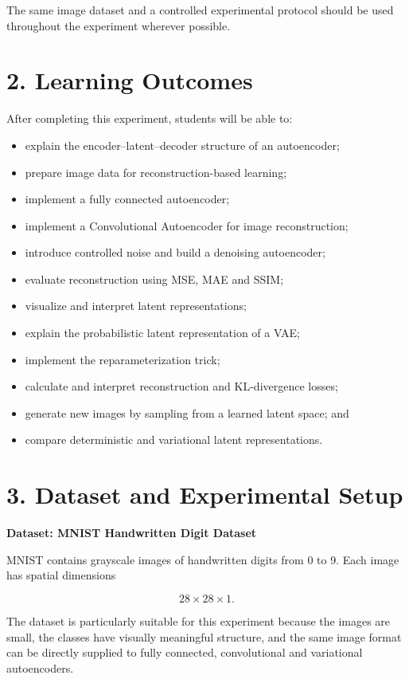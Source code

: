 \documentclass[10pt]{article}
\begin{document}
The same image dataset and a controlled experimental protocol should be used
throughout the experiment wherever possible.

\section*{2. Learning Outcomes}

After completing this experiment, students will be able to:

\begin{itemize}
\item explain the encoder--latent--decoder structure of an autoencoder;
\item prepare image data for reconstruction-based learning;
\item implement a fully connected autoencoder;
\item implement a Convolutional Autoencoder for image reconstruction;
\item introduce controlled noise and build a denoising autoencoder;
\item evaluate reconstruction using MSE, MAE and SSIM;
\item visualize and interpret latent representations;
\item explain the probabilistic latent representation of a VAE;
\item implement the reparameterization trick;
\item calculate and interpret reconstruction and KL-divergence losses;
\item generate new images by sampling from a learned latent space; and
\item compare deterministic and variational latent representations.
\end{itemize}

\section*{3. Dataset and Experimental Setup}

\textbf{Dataset: MNIST Handwritten Digit Dataset}

MNIST contains grayscale images of handwritten digits from 0 to 9. Each image
has spatial dimensions

\[
28\times28\times1.
\]

The dataset is particularly suitable for this experiment because the images
are small, the classes have visually meaningful structure, and the same image
format can be directly supplied to fully connected, convolutional and
variational autoencoders.
\end{document}
